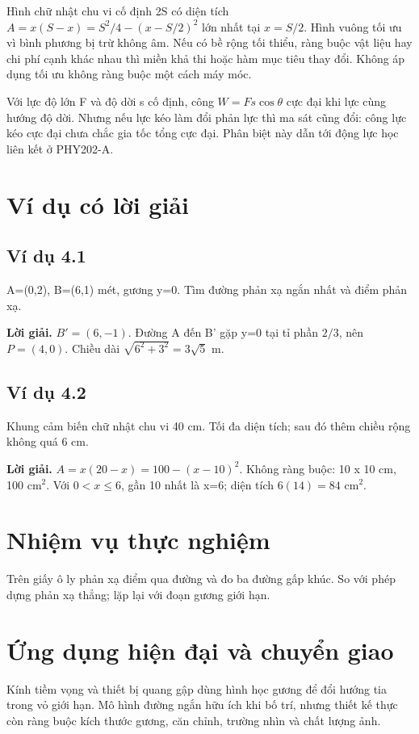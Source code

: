 \documentclass[11pt,a4paper,openany]{book}
\begin{document}
Hình chữ nhật chu vi cố định 2S có diện tích $A=x(S-x)=S^2/4-(x-S/2)^2$ lớn nhất tại $x=S/2$. Hình vuông tối ưu vì bình phương bị trừ không âm. Nếu có bề rộng tối thiểu, ràng buộc vật liệu hay chi phí cạnh khác nhau thì miền khả thi hoặc hàm mục tiêu thay đổi. Không áp dụng tối ưu không ràng buộc một cách máy móc.

Với lực độ lớn F và độ dời s cố định, công $W=Fs\cos\theta$ cực đại khi lực cùng hướng độ dời. Nhưng nếu lực kéo làm đổi phản lực thì ma sát cũng đổi: công lực kéo cực đại chưa chắc gia tốc tổng cực đại. Phân biệt này dẫn tới động lực học liên kết ở PHY202-A.
\begin{center}
\end{center}
\section{Ví dụ có lời giải}
\subsection*{Ví dụ 4.1}
A=(0,2), B=(6,1) mét, gương y=0. Tìm đường phản xạ ngắn nhất và điểm phản xạ.

\textbf{Lời giải.} $B'=(6,-1)$. Đường A đến B' gặp y=0 tại tỉ phần $2/3$, nên $P=(4,0)$. Chiều dài $\sqrt{6^2+3^2}=3\sqrt5$ m.
\subsection*{Ví dụ 4.2}
Khung cảm biến chữ nhật chu vi 40 cm. Tối đa diện tích; sau đó thêm chiều rộng không quá 6 cm.

\textbf{Lời giải.} $A=x(20-x)=100-(x-10)^2$. Không ràng buộc: 10 x 10 cm, 100 cm$^2$. Với $0<x\le6$, gần 10 nhất là x=6; diện tích $6(14)=84$ cm$^2$.
\section{Nhiệm vụ thực nghiệm}
Trên giấy ô ly phản xạ điểm qua đường và đo ba đường gấp khúc. So với phép dựng phản xạ thẳng; lặp lại với đoạn gương giới hạn.
\section{Ứng dụng hiện đại và chuyển giao}
Kính tiềm vọng và thiết bị quang gập dùng hình học gương để đổi hướng tia trong vỏ giới hạn. Mô hình đường ngắn hữu ích khi bố trí, nhưng thiết kế thực còn ràng buộc kích thước gương, căn chỉnh, trường nhìn và chất lượng ảnh.
\end{document}
